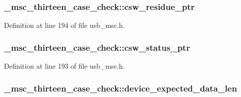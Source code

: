 \subsubsection[{\texorpdfstring{csw\+\_\+residue\+\_\+ptr}{csw_residue_ptr}}]{ \+\_\+msc\+\_\+thirteen\+\_\+case\+\_\+check\+::csw\+\_\+residue\+\_\+ptr}\hypertarget{struct__msc__thirteen__case__check_a7c607fc22457f1511232851342cd99f1}{}\label{struct__msc__thirteen__case__check_a7c607fc22457f1511232851342cd99f1}


Definition at line 194 of file usb\+\_\+msc.\+h.

\subsubsection[{\texorpdfstring{csw\+\_\+status\+\_\+ptr}{csw_status_ptr}}]{ \+\_\+msc\+\_\+thirteen\+\_\+case\+\_\+check\+::csw\+\_\+status\+\_\+ptr}\hypertarget{struct__msc__thirteen__case__check_a7fa1920a1a743613eb776d409f7e5c53}{}\label{struct__msc__thirteen__case__check_a7fa1920a1a743613eb776d409f7e5c53}


Definition at line 193 of file usb\+\_\+msc.\+h.

\subsubsection[{\texorpdfstring{device\+\_\+expected\+\_\+data\+\_\+len}{device_expected_data_len}}]{ \+\_\+msc\+\_\+thirteen\+\_\+case\+\_\+check\+::device\+\_\+expected\+\_\+data\+\_\+len}\hypertarget{struct__msc__thirteen__case__check_a01fb569bd95043806a1a4b2967874222}{}\label{struct__msc__thirteen__case__check_a01fb569bd95043806a1a4b2967874222}


